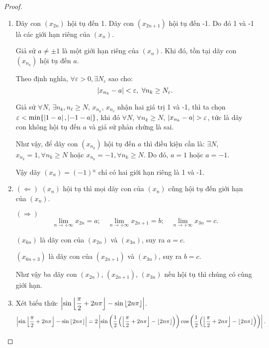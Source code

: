 \documentclass[class=analysis,crop=false]{standalone}
\begin{document}
\begin{proof}
    \begin{enumerate}[label = (\roman*)]
        \item Dãy con $(x_{2n})$ hội tụ đến 1. Dãy con $(x_{2n+1})$ hội tụ đến -1. Do đó 1 và -1 là các giới hạn riêng của $(x_{n})$.
            \par Giả sử $a\ne\pm{1}$ là một giới hạn riêng của $(x_{n})$. Khi đó, tồn tại dãy con $(x_{n_{k}})$ hội tụ đến $a$.
            \par Theo định nghĩa, $\forall\varepsilon > 0, \exists N_{\varepsilon}$ sao cho:
            \[
                \left\vert{x_{n_{k}} - a}\right\vert < \varepsilon,\ \forall n_{k}\ge N_{\varepsilon}.
            \]
            \par Giả sử $\forall N$, $\exists n_{k}, n_{\ell}\ge N$, $x_{n_{k}}$, $x_{n_{\ell}}$ nhận hai giá trị 1 và -1, thì ta chọn $\varepsilon < \min\{ \left\vert{1 - a}\right\vert, \left\vert{-1 - a}\right\vert \}$, khi đó $\forall N$, $\forall n_{k}\ge N$, $\left\vert{x_{n_{k}} - a}\right\vert > \varepsilon$, tức là dãy con không hội tụ đến $a$ và giả sử phản chứng là sai.
            \par Như vậy, để dãy con $(x_{n_{k}})$ hội tụ đến $a$ thì điều kiện cần là: $\exists N$, $x_{n_{k}} = 1, \forall n_{k}\ge N$ hoặc $x_{n_{k}} = -1, \forall n_{k}\ge N$. Do đó, $a = 1$ hoặc $a = -1$.
            \bigskip
            \par Vậy dãy $(x_{n}) = (-1){}^{n}$ chỉ có hai giới hạn riêng là 1 và -1.
        \item $(\Leftarrow)$ $(x_{n})$ hội tụ thì mọi dãy con của $(x_{n})$ cũng hội tụ đến giới hạn của $(x_{n})$.
            \par $(\Rightarrow)$
            \[
                \lim\limits_{n\to+\infty}x_{2n} = a;\quad\lim\limits_{n\to+\infty}x_{2n+1} = b;\quad\lim\limits_{n\to+\infty}x_{3n} = c.
            \]
            \par $(x_{6n})$ là dãy con của $(x_{2n})$ và $(x_{3n})$, suy ra $a = c$.
            \par $(x_{6n+3})$ là dãy con của $(x_{2n+1})$ và $(x_{3n})$, suy ra $b = c$.
            \par Như vậy ba dãy con $(x_{2n})$, $(x_{2n+1})$, $(x_{3n})$ nếu hội tụ thì chúng có cùng giới hạn.
        \item Xét biểu thức $\left\vert{\sin\left\lfloor{\dfrac{\pi}{2} + 2n\pi}\right\rfloor - \sin\left\lfloor{2n\pi}\right\rfloor}\right\vert$.
            \[
                \left\vert{\sin\left\lfloor{\dfrac{\pi}{2} + 2n\pi}\right\rfloor - \sin\left\lfloor{2n\pi}\right\rfloor}\right\vert = 2\left\vert{\sin\left(\dfrac{1}{2}\left(\left\lfloor{\dfrac{\pi}{2} + 2n\pi}\right\rfloor - \left\lfloor{2n\pi}\right\rfloor\right)\right)\cos\left(\dfrac{1}{2}\left(\left\lfloor{\dfrac{\pi}{2} + 2n\pi}\right\rfloor - \left\lfloor{2n\pi}\right\rfloor\right)\right)}\right\vert.
\]
\end{enumerate}
\end{proof}
\end{document}
